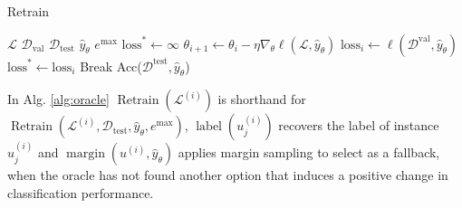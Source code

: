 \documentclass[]{article}
\begin{document}
\begin{minipage}{0.5\linewidth}
	\begin{algorithm}[H]
		\caption{Retrain}\label{alg:retrain}
		\begin{algorithmic}[1]
			\Require $\mathcal{L}$ 
			\Require $\mathcal{D}_\text{val}$ 
			\Require $\mathcal{D}_\text{test}$ 
			\Require $\hat y_\theta$ 
			\Require $e^\text{max}$ 
			\State $\text{loss}^* \gets \infty$
			\State $\theta_{i+1} \gets \theta_i - \eta \nabla_\theta \ell(\mathcal{L}, \hat y_{\theta})$
			\State $\text{loss}_i \gets \ell(\mathcal{D}^\text{val}, \hat y_{\theta})$
			\State $\text{loss}^* \gets \text{loss}_i$
			\Else
			\State Break
			\EndIf
			\EndFor
			\State
			\Return Acc($\mathcal{D}^\text{test}, \hat y_{\theta}$)
		\end{algorithmic}
	\end{algorithm}
	In Alg. \ref{alg:oracle} $\operatorname{Retrain}(\mathcal{L}^{(i)})$ is shorthand for $\operatorname{Retrain}(\mathcal{L}^{(i)}, \mathcal{D}_\text{test}, \hat y_\theta, e^\text{max})$, $\operatorname{label}(u^{(i)}_{j})$ recovers the label of instance $u^{(i)}_{j}$ and $\operatorname{margin}(u^{(i)}, \hat y_\theta)$ applies margin sampling to select as a fallback, when the oracle has not found another option that induces a positive change in classification performance.
\end{minipage}


\end{document}
